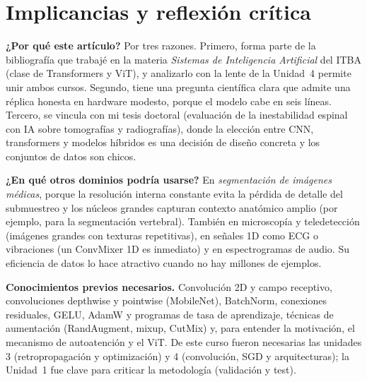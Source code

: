 \documentclass[11pt,a4paper]{article}
\begin{document}


\section{Implicancias y reflexión crítica}
\textbf{¿Por qué este artículo?} Por tres razones. Primero, forma parte de la bibliografía que trabajé en la
materia \emph{Sistemas de Inteligencia Artificial} del ITBA (clase de Transformers y ViT), y analizarlo con la
lente de la Unidad~4 permite unir ambos cursos. Segundo, tiene una pregunta científica clara que admite una réplica
honesta en hardware modesto, porque el modelo cabe en seis líneas. Tercero, se vincula con mi tesis doctoral
(evaluación de la inestabilidad espinal con IA sobre tomografías y radiografías), donde la elección entre CNN,
transformers y modelos híbridos es una decisión de diseño concreta y los conjuntos de datos son chicos.

\textbf{¿En qué otros dominios podría usarse?} En \emph{segmentación de imágenes médicas}, porque la resolución
interna constante evita la pérdida de detalle del submuestreo y los núcleos grandes capturan contexto anatómico
amplio (por ejemplo, para la segmentación vertebral). También en microscopía y teledetección (imágenes grandes con
texturas repetitivas), en señales 1D como ECG o vibraciones (un ConvMixer 1D es inmediato) y en espectrogramas de
audio. Su eficiencia de datos lo hace atractivo cuando no hay millones de ejemplos.

\textbf{Conocimientos previos necesarios.} Convolución 2D y campo receptivo, convoluciones depthwise y pointwise
(MobileNet), BatchNorm, conexiones residuales, GELU, AdamW y programas de tasa de aprendizaje, técnicas de
aumentación (RandAugment, mixup, CutMix) y, para entender la motivación, el mecanismo de autoatención y el ViT.
De este curso fueron necesarias las unidades 3 (retropropagación y optimización) y 4 (convolución, SGD y
arquitecturas); la Unidad~1 fue clave para criticar la metodología (validación y test).
\end{document}
